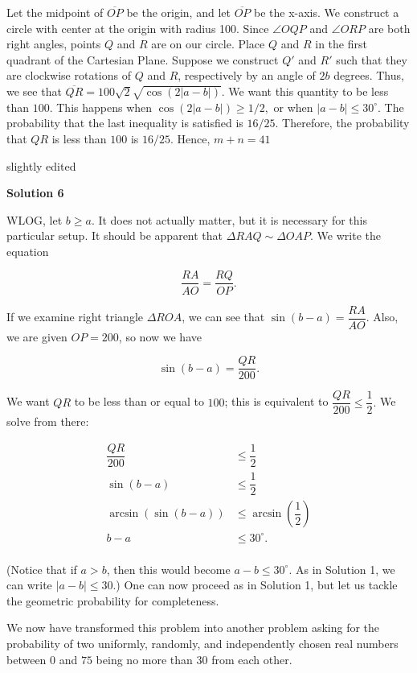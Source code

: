 \begin{enumerate}
 Let the midpoint of $\overline{OP}$ be the origin, and let $\overline{OP}$ be the x-axis. We construct a circle with center at the origin with radius 100. Since $\angle OQP$ and $\angle ORP$ are both right angles, points $Q$ and $R$ are on our circle. Place $Q$ and $R$ in the first quadrant of the Cartesian Plane. Suppose we construct $Q'$ and $R'$ such that they are clockwise rotations of $Q$ and $R$, respectively by an angle of $2b$ degrees. Thus, we see that $\overline{QR}=100\sqrt{2}\sqrt{\cos(2|a-b|)}$. We want this quantity to be less than $100$. This happens when $\cos(2|a-b|) \ge 1/2,$ or when $|a-b|\le 30^{\circ}$. The probability that the last inequality is satisfied is $16/25$. Therefore, the probability that $QR$ is less than $100$ is $16/25$. Hence, $m+n=\boxed{41}$

 
slightly edited

 


 



\textbf{Solution 6}

WLOG, let $b\ge a$. It does not actually matter, but it is necessary for this particular setup. It should be apparent that $\Delta RAQ\sim\Delta OAP$. We write the equation 

 
 \[\dfrac{RA}{AO}=\dfrac{RQ}{OP}.\] 

 If we examine right triangle $\Delta ROA$, we can see that $\sin(b-a)=\dfrac{RA}{AO}$. Also, we are given $OP=200$, so now we have 

 
 \[\sin(b-a)=\dfrac{QR}{200}.\]

 We want $QR$ to be less than or equal to $100$; this is equivalent to $\dfrac{QR}{200}\le\dfrac12.$ We solve from there: 

 \begin{align*}\dfrac{QR}{200}&\le\dfrac12 \\\sin(b-a)&\le\dfrac12 \\\arcsin(\sin(b-a))&\le\arcsin\left(\dfrac12\right) \\b-a&\le30^\circ. \\\end{align*}


 (Notice that if $a>b$, then this would become $a-b\le30^\circ.$ As in Solution 1, we can write $|a-b|\le30$.) One can now proceed as in Solution 1, but let us tackle the geometric probability for completeness. 

 We now have transformed this problem into another problem asking for the probability of two uniformly, randomly, and independently chosen real numbers between $0$ and $75$ being no more than $30$ from each other. 


\end{enumerate}
